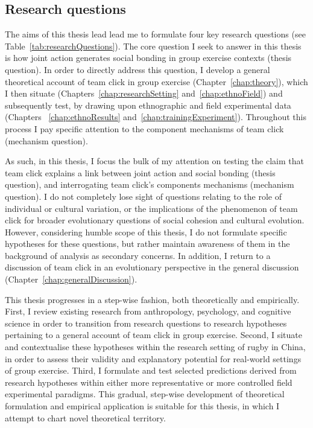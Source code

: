 \begin{CJK}{UTF8}{gbsn}
\subsection{Research questions\label{sect:researchQuestions}}
The aims of this thesis lead lead me to formulate four key research questions  (see Table~\ref{tab:researchQuestions}).  The core question I seek to answer in this thesis is how joint action generates social bonding in group exercise contexts (thesis question).  In order to directly address this question, I develop a general theoretical account of team click in group exercise (Chapter~\ref{chap:theory}), which I then situate (Chapters~\ref{chap:researchSetting} and~\ref{chap:ethnoField}) and subsequently test, by drawing upon ethnographic and field experimental data (Chapters ~\ref{chap:ethnoResults} and~\ref{chap:trainingExperiment}).  Throughout this process I pay specific attention to the component mechanisms of team click (mechanism question).



As such, in this thesis, I focus the bulk of my attention on testing the claim that team click explains a link between joint action and social bonding (thesis question), and interrogating team click's components mechanisms (mechanism question).   I do not completely lose sight of questions relating to the role of individual or cultural variation, or the implications of the phenomenon of team click for broader evolutionary questions of social cohesion and cultural evolution.  However, considering humble scope of this thesis, I do not formulate specific hypotheses for these questions, but rather maintain awareness of them in the background of analysis as secondary concerns.  In addition, I return to a discussion of team click in an evolutionary perspective in the general discussion (Chapter~\ref{chap:generalDiscussion}).

This thesis progresses in a step-wise fashion, both theoretically and empirically.  First, I review existing research from anthropology, psychology, and cognitive science in order to transition from research questions to research hypotheses pertaining to a general account of team click in group exercise.  Second, I situate and contextualise these hypotheses within the research setting of rugby in China, in order to assess their validity and explanatory potential for real-world settings of group exercise.  Third, I formulate and test selected predictions derived from research hypotheses within either more representative or more controlled field experimental paradigms.
This gradual, step-wise development of theoretical formulation and empirical application is suitable for this thesis, in which I attempt to chart novel theoretical territory.



\end{CJK}

